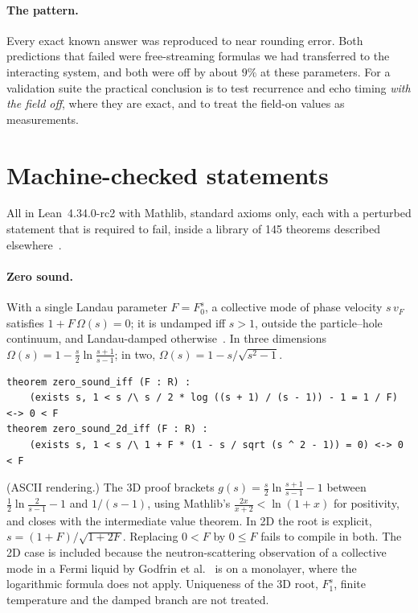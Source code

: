 \documentclass[11pt,a4paper]{article}
\begin{document}
\paragraph{The pattern.} Every exact known answer was reproduced to near rounding error. Both
predictions that failed were free-streaming formulas we had transferred to the interacting system, and
both were off by about $9\%$ at these parameters. For a validation suite the practical conclusion is to
test recurrence and echo timing \emph{with the field off}, where they are exact, and to treat the
field-on values as measurements.

\section{Machine-checked statements}
\label{sec:lean}

All in Lean~4.34.0-rc2 with Mathlib, standard axioms only, each with a perturbed statement that is
required to fail, inside a library of 145 theorems described elsewhere~\cite{CallensLean}.

\paragraph{Zero sound.} With a single Landau parameter $F=F_0^s$, a collective mode of phase velocity
$s\,v_F$ satisfies $1+F\,\Omega(s)=0$; it is undamped iff $s>1$, outside the particle--hole continuum,
and Landau-damped otherwise~\cite{BaymPethick}. In three dimensions
$\Omega(s)=1-\tfrac s2\ln\frac{s+1}{s-1}$; in two, $\Omega(s)=1-s/\sqrt{s^2-1}$.
\begin{verbatim}
theorem zero_sound_iff (F : R) :
    (exists s, 1 < s /\ s / 2 * log ((s + 1) / (s - 1)) - 1 = 1 / F) <-> 0 < F
theorem zero_sound_2d_iff (F : R) :
    (exists s, 1 < s /\ 1 + F * (1 - s / sqrt (s ^ 2 - 1)) = 0) <-> 0 < F
\end{verbatim}
(ASCII rendering.) The 3D proof brackets $g(s)=\tfrac s2\ln\frac{s+1}{s-1}-1$ between
$\tfrac12\ln\frac{2}{s-1}-1$ and $1/(s-1)$, using Mathlib's $\frac{2x}{x+2}<\ln(1+x)$ for positivity,
and closes with the intermediate value theorem. In 2D the root is explicit,
$s=(1+F)/\sqrt{1+2F}$. Replacing $0<F$ by $0\le F$ fails to compile in both. The 2D case is included
because the neutron-scattering observation of a collective mode in a Fermi liquid by Godfrin et
al.~\cite{Godfrin2012} is on a monolayer, where the logarithmic formula does not apply. Uniqueness of the
3D root, $F_1^s$, finite temperature and the damped branch are not treated.
\end{document}
